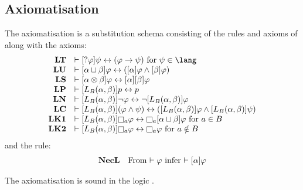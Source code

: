 \subsection{Axiomatisation}

\begin{definition}\label{afl-k-axioms}
The axiomatisation \axiomAflK{} is a substitution schema consisting of the rules and axioms of \axiomK{} along with the axioms:
$$
\begin{array}{rl}
    {\bf LT} & \proves \actionA{\test{\phi}} \psi \iff (\phi \implies \psi) \text{ for } \psi \in \lang\\
    {\bf LU} & \proves \actionA{\alpha \choice \beta} \phi \iff (\actionA{\alpha} \phi \land \actionA{\beta} \phi)\\
    {\bf LS} & \proves \actionA{\alpha \compose \beta} \phi \iff \actionA{\alpha} \actionA{\beta} \phi\\
    {\bf LP} & \proves \actionA{\learnsBs (\alpha, \beta)} \atomP \iff \atomP\\
    {\bf LN} & \proves \actionA{\learnsBs (\alpha, \beta)} \neg \phi \iff \neg \actionA{\learnsBs (\alpha, \beta)} \phi\\
    {\bf LC} & \proves \actionA{\learnsBs (\alpha, \beta)} (\phi \land \psi) \iff (\actionA{\learnsBs (\alpha, \beta)} \phi \land \actionA{\learnsBs (\alpha, \beta)} \psi)\\
    {\bf LK1} & \proves \actionA{\learnsBs (\alpha, \beta)} \necessaryA \phi \iff \necessaryA \actionA{\alpha \choice \beta} \phi \text{ for } \agentA \in \agentsB\\
    {\bf LK2} & \proves \actionA{\learnsBs (\alpha, \beta)} \necessaryA \phi \iff \necessaryA \phi \text{ for } \agentA \notin \agentsB
\end{array}
$$
and the rule:
$$
\begin{array}{rl}
    {\bf NecL} & \text{From $\vdash \varphi$ infer $\vdash {[ {\alpha} ]} \varphi$}
\end{array}
$$
\end{definition}

\begin{proposition}\label{afl-k-axioms-soundness}
The axiomatisation \axiomAflK{} is sound in the logic \logicAmlK{}.
\end{proposition}

